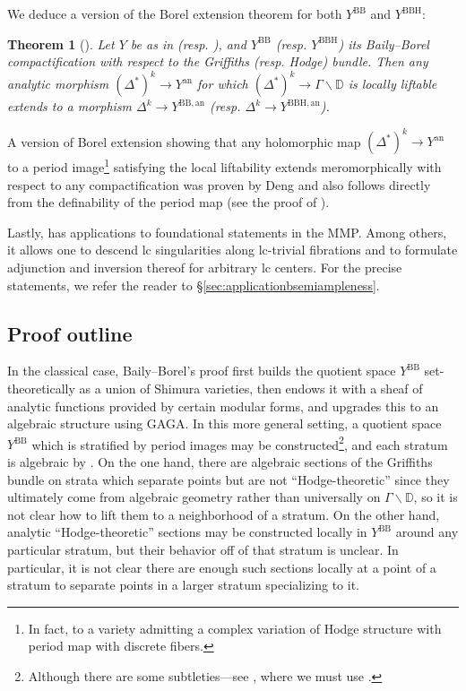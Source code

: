 \documentclass{amsart}
\newcommand{\bs}{\backslash}
\newcommand{\an}{\operatorname{an}}
\newtheorem{thm}[theorem]{Theorem}
\theoremstyle{definition}
\theoremstyle{remark}
\def\bD{\mathbb{D}}
\def\an{\mathrm{an}}
\def\BB{\mathrm{BB}}
\def\BBH{\mathrm{BBH}}
\numberwithin{equation}{section}
\begin{document}
We deduce a version of the Borel extension theorem for both $Y^\BB$ and $Y^\BBH$:
\begin{thm}[]\label{thm:borelextmain}  Let $Y$ be as in  (resp. ), and $Y^\BB$ (resp. $Y^\BBH$) its Baily--Borel compactification with respect to the Griffiths (resp. Hodge) bundle.  Then any analytic morphism $(\Delta^*)^k\to Y^\an$ for which $(\Delta^*)^k\to\Gamma\bs\bD$ is locally liftable extends to a morphism $\Delta^k\to Y^{\BB,\an}$ (resp. $\Delta^k\to Y^{\BBH,\an}$).
\end{thm}

A version of Borel extension showing that any holomorphic map $(\Delta^*)^k\to Y^\an$ to a period image\footnote{In fact, to a variety admitting a complex variation of Hodge structure with period map with discrete fibers.} satisfying the local liftability extends meromorphically with respect to any compactification was proven by Deng \cite{dengpicard} and also follows directly from the definability of the period map \cite{bkt} (see the proof of ).


Lastly,  has applications to foundational statements in the MMP.
Among others, it allows one to descend lc singularities along lc-trivial fibrations and to formulate adjunction and inversion thereof for arbitrary lc centers.
For the precise statements, we refer the reader to \S \ref{sec:applicationbsemiampleness}.



\subsection{Proof outline}
\def\quotientY{Z}

In the classical case, Baily--Borel's proof \cite{BB66} first builds the quotient space $Y^\BB$ set-theoretically as a union of Shimura varieties, then endows it with a sheaf of analytic functions provided by certain modular forms, and upgrades this to an algebraic structure using GAGA. In this more general setting, a quotient space $Y^\BB$ which is stratified by period images may be constructed\footnote{Although there are some subtleties---see , where we must use .}, and each stratum is algebraic by \cite{BBT23}.  On the one hand, there are algebraic sections of the Griffiths bundle on strata which separate points but are not ``Hodge-theoretic'' since they ultimately come from algebraic geometry rather than universally on $\Gamma\bs\bD$, so it is not clear how to lift them to a neighborhood of a stratum.  On the other hand, analytic ``Hodge-theoretic'' sections may be constructed locally in $Y^\BB$ around any particular stratum, but their behavior off of that stratum is unclear.  In particular, it is not clear there are enough such sections locally at a point of a stratum to separate points in a larger stratum specializing to it.
\end{document}
